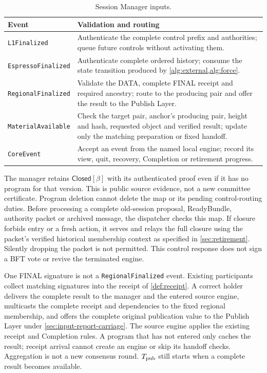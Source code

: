 \documentclass[11pt,a4paper]{article}
\newcommand{\tagg}[1]{\ensuremath{\mathsf{#1}}}
\begin{document}
\begin{table}[htbp]\centering\small
\caption{Session Manager inputs.}
\label{tab:manager-inputs}
\begin{tabularx}{\linewidth}{@{}>{\raggedright\arraybackslash}p{.24\linewidth}Y@{}}\toprule
Event & Validation and routing\\\midrule
\texttt{L1Finalized} & Authenticate the complete control prefix and
authorities; queue future controls without activating them.\\
\texttt{EspressoFinalized} & Authenticate complete ordered history;
consume the state transition produced by \cref{alg:external,alg:force}.\\
\texttt{RegionalFinalized} & Validate the DATA, complete FINAL receipt
and required ancestry; route to the producing pair and offer the result
to the Publish Layer.\\
\texttt{MaterialAvailable} & Check the target pair, anchor's producing
pair, height and hash, requested object and verified result; update only
the matching preparation or fixed handoff.\\
\texttt{CoreEvent} & Accept an event from the named local engine;
record its view, quit, recovery, Completion or retirement progress.\\\bottomrule
\end{tabularx}
\end{table}

The manager retains $\tagg{Closed}[\beta]$ with its authenticated proof
even if it has no program for that version. This is public source evidence,
not a new committee certificate. Program deletion cannot delete the map
or its pending control-routing duties. Before processing a complete
old-session proposal, ReadyBundle, authority packet or archived message,
the dispatcher checks this map. If closure forbids entry or a fresh
action, it serves and relays the full closure using the packet's verified
historical membership context as specified in \cref{sec:retirement}.
Silently dropping the packet is not permitted. This control response
does not sign a BFT vote or revive the terminated engine.

One FINAL signature is not a \texttt{RegionalFinalized} event. Existing
participants collect matching signatures into the receipt of
\cref{def:receipt}. A correct holder delivers the complete result to
the manager and the entered source engine, multicasts the complete
receipt and dependencies to the fixed regional membership, and offers
the complete original publication value to the Publish Layer under
\cref{sec:input-report-carriage}. The source engine applies the existing receipt and Completion
rules. A program that has not entered only caches the result; receipt
arrival cannot create an engine or skip its handoff checks. Aggregation
is not a new consensus round. $T_{\rm pub}$ still starts when a complete
result becomes available.
\end{document}
